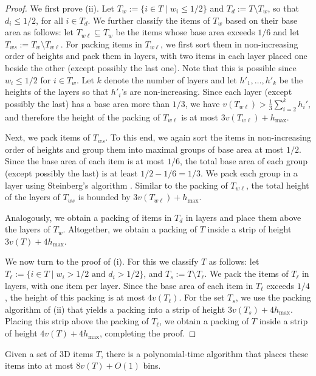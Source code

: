 \documentclass[a4paper,UKenglish,cleveref, autoref, thm-restate]{lipics-v2021}
\begin{document}
\begin{proof}
    We first prove (ii). Let $T_w := \{i\in T \mid w_i \le 1/2\}$ and $T_d := T \setminus T_w$, so that $d_i \le 1/2$, for all $i\in T_d$. We further classify the items of $T_w$ based on their base area as follows: let $T_{w\ell}\subseteq T_w$ be the items whose base area exceeds $1/6$ and let $T_{ws} := T_w \setminus T_{w\ell}$. For packing items in $T_{w\ell}$, we first sort them in non-increasing order of heights and pack them in layers, with two items in each layer placed one beside the other (except possibly the last one). Note that this is possible since $w_i \le 1/2$ for $i\in T_w$. Let $k$ denote the number of layers and let $h'_1,\ldots, h'_k$ be the heights of the layers so that $h'_i$'s are non-increasing. Since each layer (except possibly the last) has a base area more than $1/3$, we have $v(T_{w\ell})> \frac{1}{3}\sum_{i=2}^{k} h_i'$, and therefore the height of the packing of $T_{w\ell}$ is at most $3v(T_{w\ell})+h_{\max}$.

    Next, we pack items of $T_{ws}$. To this end, we again sort the items in non-increasing order of heights and group them into maximal groups of base area at most $1/2$. Since the base area of each item is at most $1/6$, the total base area of each group (except possibly the last) is at least $1/2-1/6 = 1/3$. We pack each group in a layer using Steinberg's algorithm \cite{steinberg1997strip}. Similar to the packing of $T_{w\ell}$, the total height of the layers of $T_{ws}$ is bounded by $3v(T_{w\ell})+h_{\max}$.

    Analogously, we obtain a packing of items in $T_d$ in layers and place them above the layers of $T_w$. Altogether, we obtain a packing of $T$ inside a strip of height $3v(T)+4h_{\max}$.

    We now turn to the proof of (i). For this we classify $T$ as follows: let $T_{\ell} := \{i\in T \mid w_i > 1/2 \text{ and } d_i > 1/2\}$, and $T_s := T\setminus T_{\ell}$. We pack the items of $T_{\ell}$ in layers, with one item per layer. Since the base area of each item in $T_{\ell}$ exceeds $1/4$, the height of this packing is at most $4v(T_{\ell})$. For the set $T_s$, we use the packing algorithm of (ii) that yields a packing into a strip of height $3v(T_s)+4h_{\max}$. Placing this strip above the packing of $T_{\ell}$, we obtain a packing of $T$ inside a strip of height $4v(T)+4h_{\max}$, completing the proof. 
\end{proof}

\begin{theorem}
\label{thm:volume-packing}
    Given a set of 3D items $T$, there is a polynomial-time algorithm that places these items into at most $8v(T) + O(1)$ bins.
\end{theorem}
\end{document}
